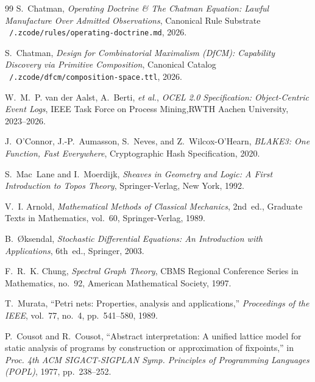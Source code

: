 \documentclass[10pt,twoside,openany]{book}
\theoremstyle{plain}
\theoremstyle{definition}
\theoremstyle{remark}
\begin{document}
\begin{thebibliography}{99}
S.~Chatman, \emph{Operating Doctrine \& The Chatman Equation: Lawful Manufacture Over Admitted Observations}, Canonical Rule Substrate \texttt{~/.zcode/rules/operating-doctrine.md}, 2026.

S.~Chatman, \emph{Design for Combinatorial Maximalism (DfCM): Capability Discovery via Primitive Composition}, Canonical Catalog \texttt{~/.zcode/dfcm/composition-space.ttl}, 2026.

W.~M.~P. van der Aalst, A.~Berti, \emph{et al.}, \emph{OCEL 2.0 Specification: Object-Centric Event Logs}, IEEE Task Force on Process Mining,RWTH Aachen University, 2023--2026.

J.~O'Connor, J.-P.~Aumasson, S.~Neves, and Z.~Wilcox-O'Hearn, \emph{BLAKE3: One Function, Fast Everywhere}, Cryptographic Hash Specification, 2020.

S.~Mac~Lane and I.~Moerdijk, \emph{Sheaves in Geometry and Logic: A First Introduction to Topos Theory}, Springer-Verlag, New York, 1992.

V.~I. Arnold, \emph{Mathematical Methods of Classical Mechanics}, 2nd~ed., Graduate Texts in Mathematics, vol.~60, Springer-Verlag, 1989.

B.~\O{}ksendal, \emph{Stochastic Differential Equations: An Introduction with Applications}, 6th~ed., Springer, 2003.

F.~R.~K. Chung, \emph{Spectral Graph Theory}, CBMS Regional Conference Series in Mathematics, no.~92, American Mathematical Society, 1997.

T.~Murata, ``Petri nets: Properties, analysis and applications,'' \emph{Proceedings of the IEEE}, vol.~77, no.~4, pp.~541--580, 1989.

P.~Cousot and R.~Cousot, ``Abstract interpretation: A unified lattice model for static analysis of programs by construction or approximation of fixpoints,'' in \emph{Proc. 4th ACM SIGACT-SIGPLAN Symp. Principles of Programming Languages (POPL)}, 1977, pp.~238--252.
\end{thebibliography}
\end{document}
